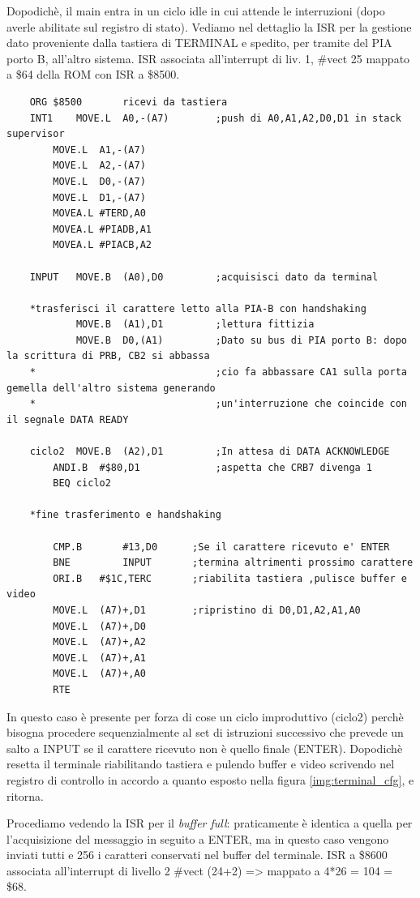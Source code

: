 Dopodichè, il main entra in un ciclo idle in cui attende le interruzioni (dopo averle abilitate sul registro di stato).
Vediamo nel dettaglio la ISR per la gestione dato proveniente dalla tastiera di TERMINAL e spedito, per tramite del PIA porto B, all'altro sistema.
ISR associata all'interrupt di liv. 1, \#vect 25 mappato a \$64 della ROM con ISR a \$8500. 

\begin{lstlisting}
    ORG	$8500		ricevi da tastiera
    INT1	MOVE.L	A0,-(A7)		;push di A0,A1,A2,D0,D1 in stack supervisor
        MOVE.L	A1,-(A7)
        MOVE.L	A2,-(A7)
        MOVE.L	D0,-(A7)
        MOVE.L	D1,-(A7)
        MOVEA.L	#TERD,A0
        MOVEA.L	#PIADB,A1
        MOVEA.L	#PIACB,A2
    
    INPUT	MOVE.B	(A0),D0			;acquisisci dato da terminal
    
    *trasferisci il carattere letto alla PIA-B con handshaking
            MOVE.B  (A1),D1         ;lettura fittizia 
            MOVE.B  D0,(A1)         ;Dato su bus di PIA porto B: dopo la scrittura di PRB, CB2 si abbassa
    *								;cio fa abbassare CA1 sulla porta gemella dell'altro sistema generando 
    *								;un'interruzione che coincide con il segnale DATA READY
        
    ciclo2	MOVE.B	(A2),D1			;In attesa di DATA ACKNOWLEDGE
        ANDI.B	#$80,D1				;aspetta che CRB7 divenga 1
        BEQ	ciclo2
                
    *fine trasferimento e handshaking
        
        CMP.B   	#13,D0		;Se il carattere ricevuto e' ENTER	
        BNE     	INPUT		;termina altrimenti prossimo carattere
        ORI.B	#$1C,TERC		;riabilita tastiera ,pulisce buffer e video
        MOVE.L 	(A7)+,D1		;ripristino di D0,D1,A2,A1,A0
        MOVE.L	(A7)+,D0
        MOVE.L	(A7)+,A2
        MOVE.L	(A7)+,A1
        MOVE.L	(A7)+,A0
        RTE
\end{lstlisting}

In questo caso è presente per forza di cose un ciclo improduttivo (ciclo2) perchè bisogna procedere sequenzialmente al set di istruzioni successivo che prevede un salto a INPUT se il carattere ricevuto non è quello finale (ENTER). Dopodichè resetta il terminale riabilitando tastiera e pulendo buffer e video scrivendo nel registro di controllo in accordo a quanto esposto nella figura \ref{img:terminal_cfg}, e ritorna.

Procediamo vedendo la ISR per il \textit{buffer full}: praticamente è identica a quella per l'acquisizione del messaggio in seguito a ENTER, ma in questo caso vengono inviati tutti e 256 i caratteri conservati nel buffer del terminale.
ISR a \$8600 associata all'interrupt di livello 2 \#vect (24+2) => mappato a 4*26 = 104 = \$68.

